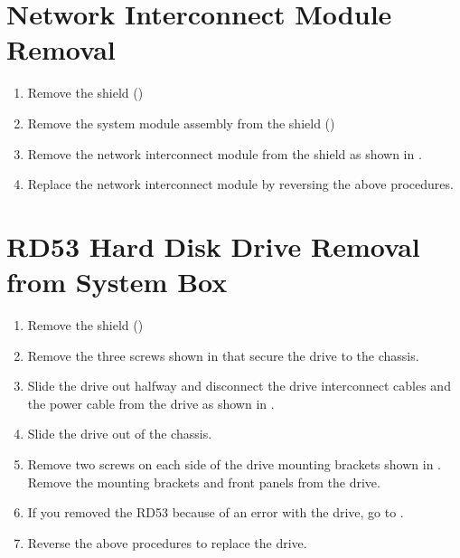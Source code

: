 \section{Network Interconnect Module Removal}
\begin{enumerate}

\item	Remove the shield ()

\item 	Remove the system module assembly from the shield ()

\item	Remove the network interconnect module from the shield as shown in .


\item	Replace the network interconnect module by reversing the above procedures.
\end{enumerate}

\newpage

\section{RD53 Hard Disk Drive Removal from System Box}

\begin{enumerate}

\item	Remove the shield ()

\item	Remove the three screws shown in  that secure the drive to
		the chassis.


\newpage

\item	Slide the drive out halfway and disconnect the drive interconnect cables
		and the power cable from the drive as shown in .


\item	Slide the drive out of the chassis.

\newpage

\item	Remove two screws on each side of the drive mounting brackets shown
		in . Remove the mounting brackets and front panels from
		the drive.


\item	If you removed the RD53 because of an error with the drive, go to
		.

\item	Reverse the above procedures to replace the drive.
\end{enumerate}

